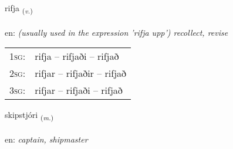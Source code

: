 \documentclass[frontgrid, backgrid]{flacards}\usepackage[]{graphicx}\usepackage[]{color}
\begin{document}
\renewcommand{\blhead}{\vskip5pt {\small\bfseries\footnotesize Sagnorð | Verb }}
\renewcommand{\bcfoot}{\vskip5pt \hspace{2pt}{\small\bfseries\footnotesize 2K}}


{rifja \small{\textsubscript{(\textit{v.})}} \\[1ex] %
\textphonetic{[rɪvja]} \\
en: \emph{(usually used in the expression 'rifja upp') recollect, revise} \\  [2ex]
\renewcommand*{\arraystretch}{0.8}
\begin{tabular}{p{1cm}l}
\textsc{1sg}: & rifja -- rifjaði -- rifjað \\ 
\textsc{2sg}: & rifjar -- rifjaðir -- rifjað \\ 
\textsc{3sg}: & rifjar -- rifjaði -- rifjað \\ 
\end{tabular}
}

\renewcommand{\flhead}{\vskip5pt \fboxsep=0pt {\small\bfseries\footnotesize Nafnorð | Noun}}
\renewcommand{\fcfoot}{\vskip5pt \fboxsep=0pt \hspace{2pt}{\small\bfseries\footnotesize 2K}}

\renewcommand{\blhead}{\vskip5pt {\small\bfseries\footnotesize Nafnorð | Noun }}
\renewcommand{\bcfoot}{\vskip5pt \hspace{2pt}{\small\bfseries\footnotesize 2K}}


{skipstjóri \small{\textsubscript{(\textit{m.})}} \\[1ex] %
\textphonetic{[scɪpstjourɪ]} \\
en: \emph{captain, shipmaster} \\  [2ex]
\renewcommand*{\arraystretch}{0.8}
}
\end{document}
